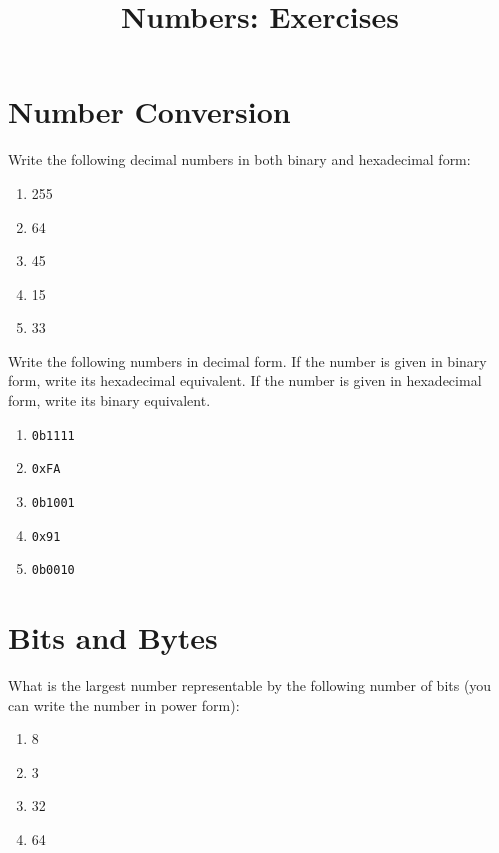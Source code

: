 \documentclass{article}
\title{Numbers: Exercises}
\begin{document}
\maketitle

\section{Number Conversion}

\begin{Exercise}

Write the following decimal numbers in both binary and hexadecimal form:
\begin{enumerate}
\item 255
\item 64
\item 45
\item 15
\item 33
\end{enumerate}

\end{Exercise}

\begin{Exercise}

Write the following numbers in decimal form.
If the number is given in binary form, write its hexadecimal equivalent.
If the number is given in hexadecimal form, write its binary equivalent.
\begin{enumerate}
\item \lstinline{0b1111}
\item \lstinline{0xFA}
\item \lstinline{0b1001}
\item \lstinline{0x91}
\item \lstinline{0b0010}
\end{enumerate}

\end{Exercise}

\section{Bits and Bytes}

\begin{Exercise}

What is the largest number representable by the following number of bits (you can write the number in power form):

\begin{enumerate}
\item 8
\item 3
\item 32
\item 64
\end{enumerate}

\end{Exercise}
\end{document}
